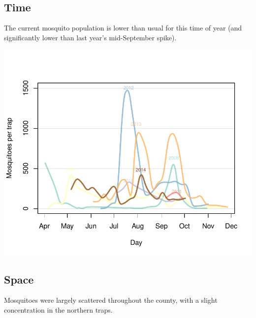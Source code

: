 \documentclass{article}
\begin{document}
\begin{multicols}{2} 



\subsection*{Time}
The current mosquito population is lower than usual for this time of year (and significantly lower than last year's mid-September spike).
\begin{center}
\includegraphics{mosquitoReport-002}
\end{center}


\vfill
\columnbreak
\subsection*{Space}
Mosquitoes were largely scattered throughout the county, with a slight concentration in the northern traps.


\end{multicols}
\end{document}
